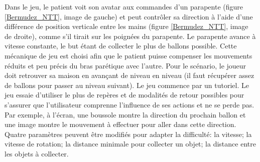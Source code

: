 		Dans le jeu, le patient voit son avatar aux commandes d'un parapente (figure \ref{Bermudez_NTT}, image de gauche) et peut contrôler sa direction à l'aide d'une différence de position verticale entre les mains (figure \ref{Bermudez_NTT}, image de droite), comme s'il tirait sur les poignées du parapente. Le parapente avance à vitesse constante, le but étant de collecter le plus de ballons possible. Cette mécanique de jeu est choisi afin que le patient puisse compenser les mouvements réduits et peu précis du bras parétique avec l'autre. Pour le scénario, le joueur doit retrouver sa maison en avançant de niveau en niveau (il faut récupérer assez de ballons pour passer au niveau suivant). Le jeu commence par un tutoriel. Le jeu essaie d'utiliser le plus de repères et de modalités de retour possibles pour s'assurer que l'utilisateur comprenne l'influence de ses actions et ne se perde pas. Par exemple, à l'écran, une boussole montre la direction du prochain ballon et une image montre le mouvement à effectuer pour aller dans cette direction.
		\\
		
		Quatre paramètres peuvent être modifiés pour adapter la difficulté: la vitesse; la vitesse de rotation; la distance minimale pour collecter un objet; la distance entre les objets à collecter.\medskip
				
		\begin{minipage}{\linewidth}
			\label{Bermudez_NTT}
		\end{minipage}\medskip		
		
